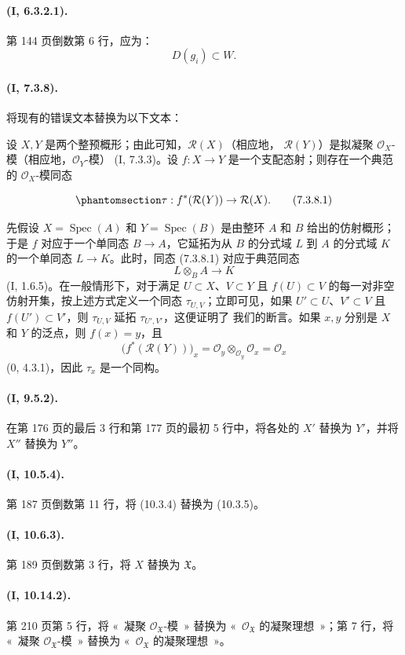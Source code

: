 \documentclass[UTF8,fontset=none,11pt,oneside,openany]{ctexbook}
\providecommand{\sh}{\mathcal}
\providecommand{\Spec}{\operatorname{Spec}}
\newcommand{\oldpage}[2][]{%
  \hypertarget{ega-source-page-#1-#2}{}%
  \marginnote{\scriptsize\textbf{#1}~|~#2}\ignorespaces}
\let\EGAOriginalLabel\label
\renewcommand{\label}[1]{\phantomsection\EGAOriginalLabel{#1}}
\begin{document}
\paragraph{(I, 6.3.2.1).}
第 144 页倒数第 6 行，应为：
\[
  D(g_i)\subset W.
\]

\paragraph{(I, 7.3.8).}
将现有的错误文本替换为以下文本：

设 $X,Y$ 是两个整预概形；由此可知，$\sh{R}(X)$（相应地，
$\sh{R}(Y)$）是拟凝聚 $\sh{O}_X$-模（相应地，$\sh{O}_Y$-模）
(I, 7.3.3)。设 $f:X\to Y$ 是一个支配态射；则存在一个典范的
$\sh{O}_X$-模同态
\oldpage[II]{222}
\begin{equation}
\label{ega2:addendum:I.7.3.8.1-zh}
  \tau:f^*(\sh{R}(Y))\to\sh{R}(X).
\tag{7.3.8.1}
\end{equation}

先假设 $X=\Spec(A)$ 和 $Y=\Spec(B)$ 是由整环 $A$ 和 $B$ 给出的仿射概形；
于是 $f$ 对应于一个单同态 $B\to A$，它延拓为从 $B$ 的分式域 $L$
到 $A$ 的分式域 $K$ 的一个单同态 $L\to K$。此时，同态 (7.3.8.1)
对应于典范同态
\[
  L\otimes_B A\to K
\]
(I, 1.6.5)。在一般情形下，对于满足 $U\subset X$、$V\subset Y$ 且
$f(U)\subset V$ 的每一对非空仿射开集，按上述方式定义一个同态
$\tau_{U,V}$；立即可见，如果 $U'\subset U$、$V'\subset V$ 且
$f(U')\subset V'$，则 $\tau_{U,V}$ 延拓 $\tau_{U',V'}$，这便证明了
我们的断言。如果 $x,y$ 分别是 $X$ 和 $Y$ 的泛点，则 $f(x)=y$，且
\[
  \bigl(f^*(\sh{R}(Y))\bigr)_x
  =\sh{O}_y\otimes_{\sh{O}_y}\sh{O}_x
  =\sh{O}_x
\]
(0, 4.3.1)，因此 $\tau_x$ 是一个同构。

\paragraph{(I, 9.5.2).}
在第 176 页的最后 3 行和第 177 页的最初 5 行中，将各处的 $X'$ 替换为
$Y'$，并将 $X''$ 替换为 $Y''$。

\paragraph{(I, 10.5.4).}
第 187 页倒数第 11 行，将 (10.3.4) 替换为 (10.3.5)。

\paragraph{(I, 10.6.3).}
第 189 页倒数第 3 行，将 $X$ 替换为 $\mathfrak X$。

\paragraph{(I, 10.14.2).}
第 210 页第 5 行，将 «~凝聚 $\sh{O}_{\mathfrak X}$-模~» 替换为
«~$\sh{O}_{\mathfrak X}$ 的凝聚理想~»；第 7 行，将
«~凝聚 $\sh{O}_{\mathfrak X}$-模~» 替换为
«~$\sh{O}_{\mathfrak X}$ 的凝聚理想~»。
\end{document}
